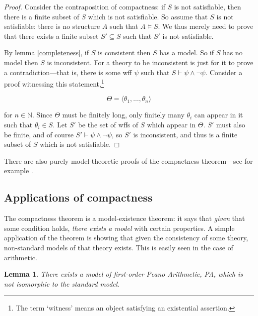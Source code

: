 \documentclass[10pt, a4paper, oneside]{article}
\theoremstyle{definition}
\theoremstyle{remark}
\theoremstyle{plain}
\newtheorem{lem}[thm]{Lemma}
\theoremstyle{plain}
\begin{document}
\begin{proof}
    Consider the contraposition of compactness: if $S$ is not satisfiable, then
    there is a finite subset of $S$ which is not satisfiable. So assume that $S$
    is not satisfiable: there is no structure $A$ such that $A \models S$. We
    thus merely need to prove that there exists a finite subset $S' \subseteq S$
    such that $S'$ is not satisfiable.
    
    By lemma \ref{completeness}, if $S$ is consistent then $S$ has a model. So
    if $S$ has no model then $S$ is inconsistent. For a theory to be
    inconsistent is just for it to prove a contradiction---that is, there is
    some wff $\psi$ such that $S \vdash \psi \wedge \neg\psi$. Consider a proof
    witnessing this statement,\footnote{The term `witness' means an object
    satisfying an existential assertion.}
    
    \begin{displaymath}
        \Theta = \langle \theta_1, \dotsc, \theta_n \rangle
    \end{displaymath}
    
    for $n \in \mathbb{N}$. Since $\Theta$ must be finitely long, only finitely
    many $\theta_i$ can appear in it such that $\theta_i \in S$. Let $S'$ be the
    set of wffs of $S$ which appear in $\Theta$. $S'$ must also be finite, and
    of course $S' \vdash \psi \wedge \neg\psi$, so $S'$ is inconsistent, and
    thus is a finite subset of $S$ which is not satisfiable.
\end{proof}

There are also purely model-theoretic proofs of the compactness theorem---see
for example \citealt[pp. 125--127]{hodges1997}.

\subsection{Applications of compactness}

The compactness theorem is a model-existence theorem: it says that \emph{given}
that some condition holds, \emph{there exists a model} with certain properties.
A simple application of the theorem is showing that given the consistency of
some theory, non-standard models of that theory exists. This is easily seen in
the case of arithmetic.

\begin{lem}
    There exists a model of first-order Peano Arithmetic, PA, which is not
    isomorphic to the standard model.
\end{lem}
\end{document}
